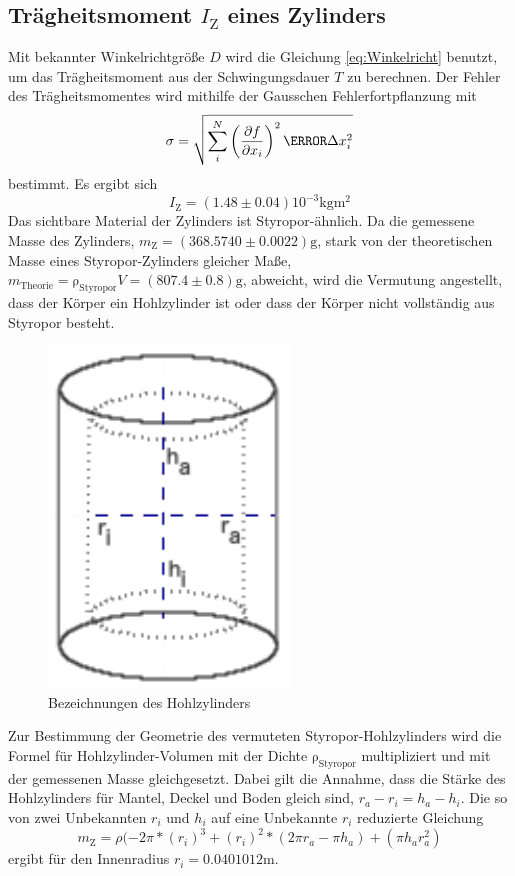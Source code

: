 \subsection{Trägheitsmoment $I_\text{Z}$ eines Zylinders}
\label{sub:traegheitsmoment_eines_zylinders}

\noindent Mit bekannter Winkelrichtgröße $D$ wird die Gleichung \eqref{eq:Winkelricht} benutzt, um das Trägheitsmoment aus der Schwingungsdauer $T$ zu berechnen. Der Fehler des Trägheitsmomentes wird mithilfe der Gausschen Fehlerfortpflanzung mit
\begin{equation}
	\label{eq:Gauss}
	\sigma=\sqrt{\sum_i^N{\left( \frac{\partial{f}}{\partial{x_i}}\right)^2\m \Delta x_i^2}}
\end{equation}bestimmt.
Es ergibt sich
\begin{equation}
	\label{wert:Zylinder}
	I_\text{Z} = (1.48\pm0.04)10^{-3} \si{\kilo\gram\meter\squared}
\end{equation}
Das sichtbare Material der Zylinders ist Styropor-ähnlich. 
Da die gemessene Masse des Zylinders, $m_\text{Z} = (368.5740\pm0.0022) \si{\gram}$, stark von der theoretischen Masse eines Styropor-Zylinders gleicher Maße, $m_\text{Theorie} = \mathup{\rho_{\text{Styropor}}}V=(807.4\pm0.8) \si{\gram}$, abweicht, 
wird die Vermutung angestellt, dass der Körper ein Hohlzylinder ist oder dass der Körper nicht vollständig aus Styropor besteht.
\begin{figure}[b]
	\label{fig:tonne}
	\centering
	\includegraphics[scale=0.5]{Bilder/Tonne.pdf}
	\caption{Bezeichnungen des Hohlzylinders}
\end{figure}
Zur Bestimmung der Geometrie des vermuteten Styropor-Hohlzylinders wird die Formel für Hohlzylinder-Volumen  mit der Dichte $\mathup{\rho_{\text{Styropor}}}$ multipliziert und mit der gemessenen Masse gleichgesetzt. 
Dabei gilt die Annahme, dass die Stärke des Hohlzylinders für Mantel, Deckel und Boden gleich sind, $r_a-r_i=h_a-h_i$. 
Die so von zwei Unbekannten $r_i$ und $h_i$ auf eine Unbekannte $r_i$ reduzierte Gleichung
\begin{equation}
	m_\text{Z}=\rho(-2\pi*(r_i)^3+(r_i)^2*(2\pi r_a-\pi h_a)+(\pi h_a r_a^2)
\end{equation}
ergibt für den Innenradius $r_i = 0.0401012\si{\meter}$.

